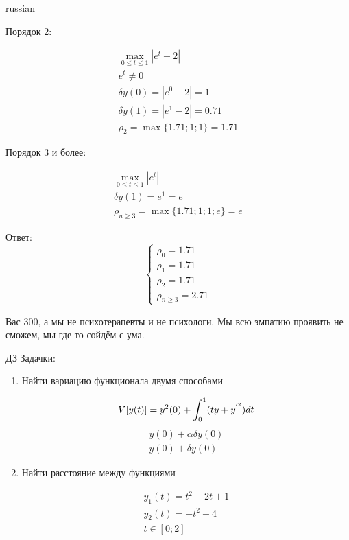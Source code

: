 \documentclass{article}
\begin{document}
\begin{otherlanguage*}{russian}
\begin{enumerate}
Порядок 2: 

\begin{align}
\max_{0 \le t \le 1} | e ^ t - 2 | \\
e^t \ne 0  \\
\delta y(0) = |e^0 - 2| = 1 \\ 
\delta y(1) = |e^1 - 2| = 0.71 \\
\rho_2 = \max \{ 1.71; 1; 1 \} = 1.71
\end{align}

Порядок 3 и более: 

\begin{align}
\max_{0 \le t \le 1} | e ^ t | \\
\delta y(1) = e^ 1 = e \\
\rho_{n \ge 3}  = \max \{ 1.71; 1; 1; e \} = e
\end{align}

Ответ: 
\begin{equation}
\begin{cases}
\rho_0 = 1.71 \\
\rho_1 = 1.71 \\
\rho_2 = 1.71 \\
\rho_{n \ge 3} = 2.71  
\end{cases}
\end{equation}

Вас 300, а мы не психотерапевты и не психологи. Мы всю эмпатию проявить не сможем, мы где-то сойдём с ума. 

ДЗ Задачки: 
\begin{enumerate}

\item Найти вариацию функционала двумя способами 

\begin{equation}
V [ y(t) ] = y^ 2 (0) + \int_0^1 (ty + y^{'^2} ) dt  \\
\end{equation}
\begin{align}
y(0) + \alpha \delta y (0) \\
y(0) + \delta y (0) 
\end{align}

\item Найти расстояние между функциями 

\begin{align}
y_1 (t) = t ^ 2 - 2 t + 1 \\
y_2(t) = -t ^ 2 + 4 \\
t \in [0;2] 
\end{align}
\end{enumerate}
\end{enumerate}
\end{otherlanguage*}
\end{document}

